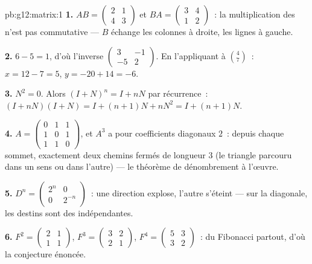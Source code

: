 \begin{solution}{pb:g12:matrix:1}
\textbf{1.} $AB = \begin{pmatrix} 2 & 1\\ 4 & 3\end{pmatrix}$ et
$BA = \begin{pmatrix} 3 & 4\\ 1 & 2\end{pmatrix}$~: la
multiplication des  n'est pas commutative --- $B$ échange
les colonnes à droite, les lignes à gauche.

\textbf{2.}  $6 - 5 = 1$, d'où l'inverse
$\begin{pmatrix} 3 & -1\\ -5 & 2\end{pmatrix}$. En l'appliquant à
$\binom{4}{7}$~: $x = 12 - 7 = 5$, $y = -20 + 14 = -6$.

\textbf{3.} $N^2 = 0$. Alors $(I + N)^n = I + nN$ par récurrence~:
$(I + nN)(I + N) = I + (n+1)N + nN^2 = I + (n+1)N$.

\textbf{4.} $A = \begin{pmatrix} 0&1&1\\ 1&0&1\\ 1&1&0
\end{pmatrix}$, et $A^3$ a pour coefficients diagonaux $2$~: depuis
chaque sommet, exactement deux chemins fermés de longueur $3$ (le
triangle parcouru dans un sens ou dans l'autre) --- le théorème de
dénombrement à l'œuvre.

\textbf{5.} $D^n = \begin{pmatrix} 2^n & 0\\ 0 & 2^{-n}
\end{pmatrix}$~: une direction explose, l'autre s'éteint --- sur la
diagonale, les destins sont des  indépendantes.

\textbf{6.} $F^2 = \begin{pmatrix} 2 & 1\\ 1 & 1\end{pmatrix}$,
$F^3 = \begin{pmatrix} 3 & 2\\ 2 & 1\end{pmatrix}$,
$F^4 = \begin{pmatrix} 5 & 3\\ 3 & 2\end{pmatrix}$~: du Fibonacci
partout, d'où la conjecture énoncée.


\end{solution}
